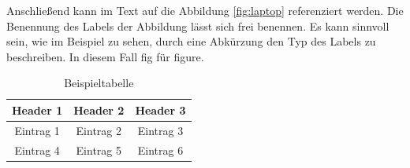 Anschließend kann im Text auf die Abbildung \ref{fig:laptop} referenziert werden. Die Benennung des Labels der Abbildung lässt sich frei benennen. Es kann sinnvoll sein, wie im Beispiel zu sehen, durch eine Abkürzung den Typ des Labels zu beschreiben. In diesem Fall  \grqq fig \glqq \space für figure.

\begin{table}[h]
    \centering
    \begin{tabular}{|c|c c|}
        \hline
         Header 1 & Header 2 & Header 3\\
         \hline
         Eintrag 1 & Eintrag 2 & Eintrag 3 \\
         Eintrag 4 & Eintrag 5 & Eintrag 6\\
        \hline
    \end{tabular}
    \caption{Beispieltabelle}
    \label{tab:my_label}
\end{table}
